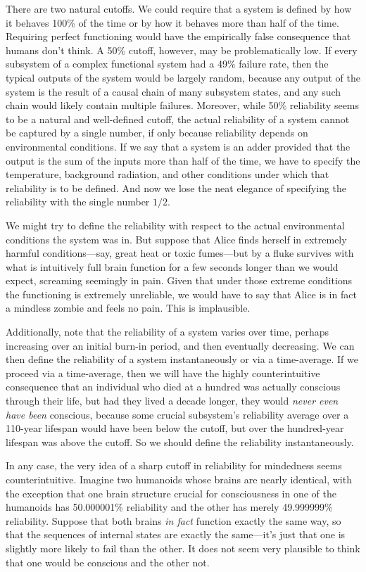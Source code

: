 There are two natural cutoffs. We could require that a system is defined by how it behaves 100\% of the time or by how it behaves
more than half of the time. Requiring perfect functioning would have the empirically false consequence that humans don't think. 
A 50\% cutoff, however, may be problematically low. If every subsystem of a complex functional system had a 49\% failure rate, then 
the typical outputs of the system would be largely random, because any output of the system is the result of a causal chain of many 
subsystem states, and any such chain would likely contain multiple failures. Moreover, while 50\% reliability seems to be a natural
and well-defined cutoff, the actual reliability of a system cannot be captured by a single number, if only because reliability
depends on environmental conditions. If we say that a system is an adder provided that the output is the sum of the inputs more
than half of the time, we have to specify the temperature, background radiation, and other conditions under which that reliability
is to be defined. And now we lose the neat elegance of specifying the reliability with the single number $1/2$.

We might try to define the reliability with respect to the actual environmental conditions the system was in. But suppose that
Alice finds herself in extremely harmful conditions---say, great heat or toxic fumes---but by a fluke survives with what is intuitively
full brain function for a few seconds longer than we would expect, screaming seemingly in pain. Given that under those extreme conditions
the functioning is extremely unreliable, we would have to say that Alice is in fact a mindless zombie and feels no pain. This is
implausible. 

Additionally, note that the reliability of a system varies over time, perhaps increasing over an initial burn-in period,
and then eventually decreasing. We can then define the reliability of a system instantaneously or via a time-average.
If we proceed via a time-average, then we will have the highly counterintuitive consequence that an individual who died
at a hundred was actually conscious through their life, but had they lived a decade longer, they would \textit{never even have been} 
conscious, because some crucial subsystem's reliability average over a 110-year lifespan would have been below the cutoff, but over
the hundred-year lifespan was above the cutoff. So we should define the reliability instantaneously. 

In any case, the very idea of a sharp cutoff in reliability for mindedness seems counterintuitive. Imagine two humanoids whose 
brains are nearly identical, with the exception that one brain structure crucial for consciousness in one of the humanoids has 
50.000001\% reliability and the other has merely 49.999999\% reliability. Suppose that both brains \textit{in fact}
function exactly the same way, so that the sequences of internal states are exactly the same---it's just that one is slightly
more likely to fail than the other. It does not seem very plausible to think that one would be conscious and the other not.

